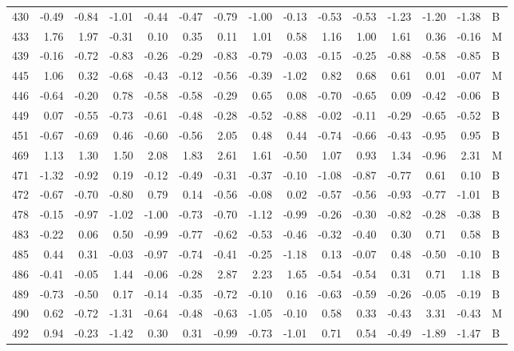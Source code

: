 \begin{table}[ht]
\begin{tabular}{rrrrrrrrrrrrrrl}
  430 & -0.49 & -0.84 & -1.01 & -0.44 & -0.47 & -0.79 & -1.00 & -0.13 & -0.53 & -0.53 & -1.23 & -1.20 & -1.38 & B \\ 
  433 & 1.76 & 1.97 & -0.31 & 0.10 & 0.35 & 0.11 & 1.01 & 0.58 & 1.16 & 1.00 & 1.61 & 0.36 & -0.16 & M \\ 
  439 & -0.16 & -0.72 & -0.83 & -0.26 & -0.29 & -0.83 & -0.79 & -0.03 & -0.15 & -0.25 & -0.88 & -0.58 & -0.85 & B \\ 
  445 & 1.06 & 0.32 & -0.68 & -0.43 & -0.12 & -0.56 & -0.39 & -1.02 & 0.82 & 0.68 & 0.61 & 0.01 & -0.07 & M \\ 
  446 & -0.64 & -0.20 & 0.78 & -0.58 & -0.58 & -0.29 & 0.65 & 0.08 & -0.70 & -0.65 & 0.09 & -0.42 & -0.06 & B \\ 
  449 & 0.07 & -0.55 & -0.73 & -0.61 & -0.48 & -0.28 & -0.52 & -0.88 & -0.02 & -0.11 & -0.29 & -0.65 & -0.52 & B \\ 
  451 & -0.67 & -0.69 & 0.46 & -0.60 & -0.56 & 2.05 & 0.48 & 0.44 & -0.74 & -0.66 & -0.43 & -0.95 & 0.95 & B \\ 
  469 & 1.13 & 1.30 & 1.50 & 2.08 & 1.83 & 2.61 & 1.61 & -0.50 & 1.07 & 0.93 & 1.34 & -0.96 & 2.31 & M \\ 
  471 & -1.32 & -0.92 & 0.19 & -0.12 & -0.49 & -0.31 & -0.37 & -0.10 & -1.08 & -0.87 & -0.77 & 0.61 & 0.10 & B \\ 
  472 & -0.67 & -0.70 & -0.80 & 0.79 & 0.14 & -0.56 & -0.08 & 0.02 & -0.57 & -0.56 & -0.93 & -0.77 & -1.01 & B \\ 
  478 & -0.15 & -0.97 & -1.02 & -1.00 & -0.73 & -0.70 & -1.12 & -0.99 & -0.26 & -0.30 & -0.82 & -0.28 & -0.38 & B \\ 
  483 & -0.22 & 0.06 & 0.50 & -0.99 & -0.77 & -0.62 & -0.53 & -0.46 & -0.32 & -0.40 & 0.30 & 0.71 & 0.58 & B \\ 
  485 & 0.44 & 0.31 & -0.03 & -0.97 & -0.74 & -0.41 & -0.25 & -1.18 & 0.13 & -0.07 & 0.48 & -0.50 & -0.10 & B \\ 
  486 & -0.41 & -0.05 & 1.44 & -0.06 & -0.28 & 2.87 & 2.23 & 1.65 & -0.54 & -0.54 & 0.31 & 0.71 & 1.18 & B \\ 
  489 & -0.73 & -0.50 & 0.17 & -0.14 & -0.35 & -0.72 & -0.10 & 0.16 & -0.63 & -0.59 & -0.26 & -0.05 & -0.19 & B \\ 
  490 & 0.62 & -0.72 & -1.31 & -0.64 & -0.48 & -0.63 & -1.05 & -0.10 & 0.58 & 0.33 & -0.43 & 3.31 & -0.43 & M \\ 
  492 & 0.94 & -0.23 & -1.42 & 0.30 & 0.31 & -0.99 & -0.73 & -1.01 & 0.71 & 0.54 & -0.49 & -1.89 & -1.47 & B \\ 

\end{tabular}
\end{table}
